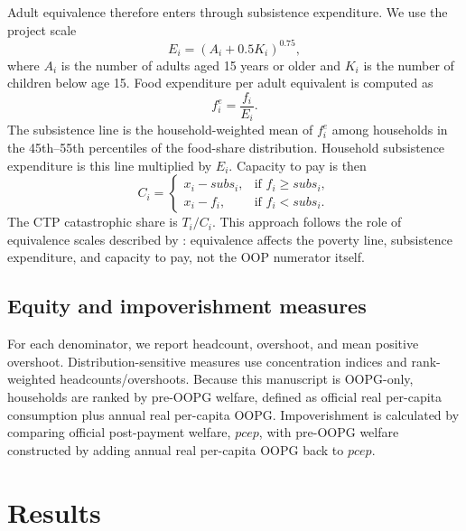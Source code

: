 \documentclass[11pt]{article}
\begin{document}
Adult equivalence therefore enters through subsistence expenditure. We use the project scale
\begin{equation}
E_i = (A_i + 0.5K_i)^{0.75},
\end{equation}
where $A_i$ is the number of adults aged 15 years or older and $K_i$ is the number of children below age 15. Food expenditure per adult equivalent is computed as
\begin{equation}
f_i^e = \frac{f_i}{E_i}.
\end{equation}
The subsistence line is the household-weighted mean of $f_i^e$ among households in the 45th--55th percentiles of the food-share distribution. Household subsistence expenditure is this line multiplied by $E_i$. Capacity to pay is then
\begin{equation}
C_i =
\begin{cases}
x_i - subs_i, & \text{if } f_i \ge subs_i, \\
x_i - f_i, & \text{if } f_i < subs_i.
\end{cases}
\end{equation}
The CTP catastrophic share is $T_i/C_i$. This approach follows the role of equivalence scales described by \citet{koch2018}: equivalence affects the poverty line, subsistence expenditure, and capacity to pay, not the OOP numerator itself.

\subsection{Equity and impoverishment measures}

For each denominator, we report headcount, overshoot, and mean positive overshoot. Distribution-sensitive measures use concentration indices and rank-weighted headcounts/overshoots. Because this manuscript is OOPG-only, households are ranked by pre-OOPG welfare, defined as official real per-capita consumption plus annual real per-capita OOPG. Impoverishment is calculated by comparing official post-payment welfare, $pcep$, with pre-OOPG welfare constructed by adding annual real per-capita OOPG back to $pcep$.

\section{Results}
\end{document}
